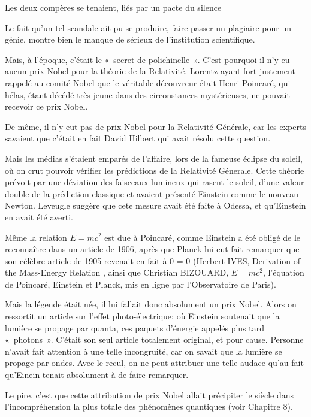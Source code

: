 \documentclass[a4paper,12pt]{article}
\begin{document}
Les deux compères se tenaient, liés par un pacte du silence 

Le fait qu’un tel scandale ait pu se produire, faire passer un plagiaire pour un génie, montre bien le manque de sérieux de l’institution scientifique.

Mais, à l’époque, c’était le « secret de polichinelle ». C’est pourquoi il n’y eu aucun prix Nobel pour la théorie de la Relativité. Lorentz ayant fort justement rappelé au comité Nobel que le véritable découvreur était Henri Poincaré, qui hélas, étant décédé très jeune dans des circonstances mystérieuses, ne pouvait recevoir ce prix Nobel.

De même, il n’y eut pas de prix Nobel pour la Relativité Générale, car les experts savaient que c’était en fait David Hilbert qui avait résolu cette question. 

Mais les médias s’étaient emparés de l’affaire, lors de la fameuse éclipse du soleil, où on crut pouvoir vérifier les prédictions de la Relativité Génerale. Cette théorie prévoit par une déviation des faisceaux lumineux qui rasent le soleil, d’une valeur double de la prédiction classique et avaient présenté Einstein comme le nouveau Newton. Leveugle suggère que cete mesure avait été faite à Odessa, et qu'Einstein en avait été averti.

Même la relation $E = mc^2$ est due à Poincaré, comme Einstein a été obligé de le reconnaître dans un article de 1906, après que Planck lui eut fait remarquer que son célèbre article de 1905 revenait en fait à 0 = 0 (Herbert IVES, Derivation of the Mass-Energy Relation \cite{Ives}, ainsi que Christian BIZOUARD, $E = mc^2$, l'équation de Poincaré, Einstein et Planck, mis en ligne par l’Observatoire de Paris).


Mais la légende était née, il lui fallait donc absolument un prix Nobel. Alors on ressortit un article sur l’effet photo-électrique: où Einstein soutenait que la lumière se propage par quanta, ces paquets d’énergie appelés plus tard « photons ». C’était son seul article totalement original, et pour cause. Personne n’avait fait attention à une telle incongruité, car on savait que la lumière se propage par ondes. Avec le recul, on ne peut attribuer une telle audace qu’au fait qu’Einein tenait absolument à de faire remarquer.

Le pire, c’est que cette attribution de prix Nobel allait précipiter le siècle dans l’incompréhension la plus totale des phénomènes quantiques (voir Chapitre 8).
\end{document}

